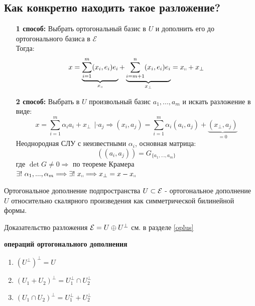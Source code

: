 \subsection*{Как конкретно находить такое разложение?}
\begin{itemize}
    \item[\textbf{1 способ:}] Выбрать ортогональный базис в $U$ и дополнить его до ортогонального базиса в $\mathcal{E}$\\
    Тогда:
    $$x = \underbrace{\sum \limits_{i=1}^m(x_i,e_i)e_i}_{x_\shortparallel}  + \underbrace{\sum \limits_{i=m+1}^n(x_i,e_i)e_i}_{x_\perp} = x_\shortparallel + x_\perp$$
    \item[\textbf{2 способ:}] Выбрать в $U$ произвольный базис $a_1,...,a_m$ и искать разложение в виде:
    $$x = \sum \limits_{i=1}^m \alpha_ia_i + x_\perp \ \ | \cdot a_j \Longrightarrow (x_i,a_j) = \sum \limits_{i=1}^m \alpha_i(a_i,a_j) + \underbrace{(x_\perp, a_j)}_{=0} $$
    Неоднородная СЛУ с неизвестными $\alpha_i$, основная матрица: 
    $$((a_i,a_j)) = G_{\{a_1,...,a_m\}}$$
    где $\det G \neq 0 \Longrightarrow$ по теореме Крамера $\exists ! \ \alpha_1,...,\alpha_m \Longrightarrow \exists ! \ x_\shortparallel \Longrightarrow x_\perp = x - x_\shortparallel$   
\end{itemize}
\begin{definition}
    Ортогональное дополнение подпространства $U \subset \mathcal{E}$ - ортогональное дополнение $U$ относительно скалярного произведения как симметрической билинейной формы.
\end{definition}
\begin{remark}
    Доказательство разложения $\mathcal{E} = U \oplus U^\perp$ см. в разделе \ref{oplus}
\end{remark}
\begin{properties} \textbf{операций ортогонального дополнения} 
    \begin{enumerate}
        \item $(U^\perp)^\perp = U$
        \item $(U_1 + U_2)^\perp = U_1^\perp \cap U_2^\perp$
        \item $(U_1 \cap U_2)^\perp = U_1^\perp + U_2^\perp$
    \end{enumerate}
\end{properties}
